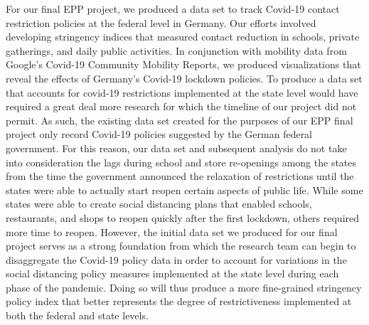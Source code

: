 For our final EPP project, we produced a data set to track Covid-19 contact restriction policies at the federal level in Germany. Our efforts involved developing stringency indices that measured contact reduction in schools, private gatherings, and daily public activities. In conjunction with mobility data from Google’s Covid-19 Community Mobility Reports, we produced visualizations that reveal the effects of Germany’s Covid-19 lockdown policies. To produce a data set that accounts for covid-19 restrictions implemented at the state level would have required a great deal more research for which the timeline of our project did not permit. As such, the existing data set created for the purposes of our EPP final project only record Covid-19 policies suggested by the German federal government. For this reason, our data set and subsequent analysis do not take into consideration the lags during school and store re-openings among the states from the time the government announced the relaxation of restrictions until the states were able to actually start reopen certain aspects of public life. While some states were able to create social distancing plans that enabled schools, restaurants, and shops to reopen quickly after the first lockdown, others required more time to reopen. However, the initial data set we produced for our final project serves as a strong foundation from which the research team can begin to disaggregate the Covid-19 policy data in order to account for variations in the social distancing policy measures implemented at the state level during each phase of the pandemic. Doing so will thus produce a more fine-grained stringency policy index that better represents the degree of restrictiveness implemented at both the federal and state levels.
